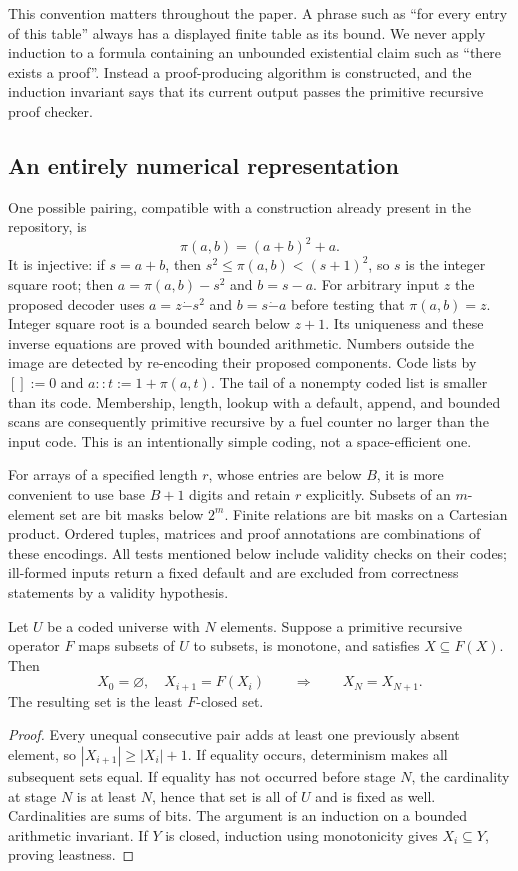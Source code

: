 This convention matters throughout the paper. A phrase such as ``for every
entry of this table'' always has a displayed finite table as its bound.
We never apply induction to a formula containing an unbounded existential
claim such as ``there exists a proof''. Instead a proof-producing algorithm
is constructed, and the induction invariant says that its current output
passes the primitive recursive proof checker.

\subsection{An entirely numerical representation}

One possible pairing, compatible with a construction already present in the
repository, is
\[
 \pi(a,b)=(a+b)^2+a.
\]
It is injective: if $s=a+b$, then $s^2\le\pi(a,b)<(s+1)^2$, so $s$ is the
integer square root; then $a=\pi(a,b)-s^2$ and $b=s-a$. For arbitrary input
$z$ the proposed decoder uses $a=z\mathbin{\dot-}s^2$ and
$b=s\mathbin{\dot-}a$ before testing that $\pi(a,b)=z$. Integer square root
is a bounded search below $z+1$. Its uniqueness and these inverse equations
are proved with bounded arithmetic. Numbers outside the image are detected
by re-encoding their proposed components. Code lists by $[]:=0$ and
$a::t:=1+\pi(a,t)$. The tail of a nonempty coded list is smaller than its
code. Membership, length, lookup with a default, append, and bounded scans
are consequently primitive recursive by a fuel counter no larger than the
input code. This is an intentionally simple coding, not a space-efficient
one.

For arrays of a specified length $r$, whose entries are below $B$, it is more
convenient to use base $B+1$ digits and retain $r$ explicitly. Subsets of an
$m$-element set are bit masks below $2^m$. Finite relations are bit masks
on a Cartesian product. Ordered tuples, matrices and proof annotations are
combinations of these encodings. All tests mentioned below include validity
checks on their codes; ill-formed inputs return a fixed default and are
excluded from correctness statements by a validity hypothesis.

\begin{lemma}\label{thm:finite-closure}
Let $U$ be a coded universe with $N$ elements. Suppose a primitive recursive
operator $F$ maps subsets of $U$ to subsets, is monotone, and satisfies
$X\subseteq F(X)$. Then
\[
 X_0=\varnothing,\quad X_{i+1}=F(X_i)
 \qquad\Longrightarrow\qquad X_N=X_{N+1}.
\]
The resulting set is the least $F$-closed set.
\end{lemma}
\begin{proof}
Every unequal consecutive pair adds at least one previously absent element,
so $|X_{i+1}|\ge |X_i|+1$. If equality occurs, determinism makes all subsequent
sets equal. If equality has not occurred before stage $N$, the cardinality at
stage $N$ is at least $N$, hence that set is all of $U$ and is fixed as well.
Cardinalities are sums of bits. The argument is an induction on a bounded
arithmetic invariant. If $Y$ is closed, induction using monotonicity gives
$X_i\subseteq Y$, proving leastness.
\end{proof}


